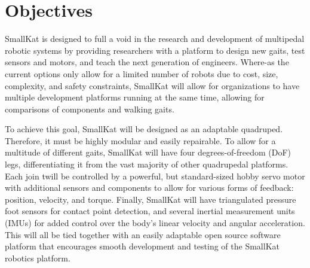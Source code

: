 



\section{Objectives}
SmallKat is designed to full a void in the research and development of multipedal robotic systems by providing researchers with a platform to design new gaits, test sensors and motors, and teach the next generation of engineers. Where-as the current options only allow for a limited number of robots due to cost,  size, complexity, and safety constraints, SmallKat will allow for organizations to have multiple development platforms running at  the  same time,  allowing  for comparisons of components and walking gaits.

To achieve this goal, SmallKat will be designed as an adaptable quadruped. Therefore, it must be highly modular and easily repairable. To allow for a multitude of different gaits, SmallKat will have four degrees-of-freedom (DoF) legs, differentiating it from the vast majority of other quadrupedal platforms. Each join twill be controlled by a powerful, but standard-sized hobby servo motor with additional sensors and components to allow for various forms of feedback: position, velocity, and torque. Finally, SmallKat will have triangulated pressure foot sensors for contact point detection, and several inertial measurement units (IMUs) for added control over the body's linear velocity and angular acceleration. This will all be tied together with an easily adaptable open source software platform that encourages smooth development and testing of the SmallKat robotics platform.


